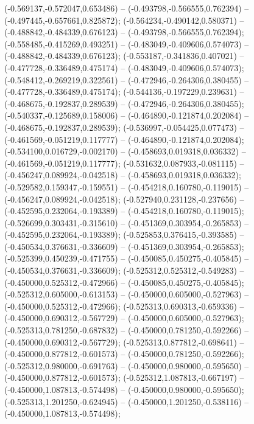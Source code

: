  (-0.569137,-0.572047,0.653486) -- (-0.493798,-0.566555,0.762394) -- (-0.497445,-0.657661,0.825872);
 (-0.564234,-0.490142,0.580371) -- (-0.488842,-0.484339,0.676123) -- (-0.493798,-0.566555,0.762394);
 (-0.558485,-0.415269,0.493251) -- (-0.483049,-0.409606,0.574073) -- (-0.488842,-0.484339,0.676123);
 (-0.553187,-0.341836,0.407021) -- (-0.477728,-0.336489,0.475174) -- (-0.483049,-0.409606,0.574073);
 (-0.548412,-0.269219,0.322561) -- (-0.472946,-0.264306,0.380455) -- (-0.477728,-0.336489,0.475174);
 (-0.544136,-0.197229,0.239631) -- (-0.468675,-0.192837,0.289539) -- (-0.472946,-0.264306,0.380455);
 (-0.540337,-0.125689,0.158006) -- (-0.464890,-0.121874,0.202084) -- (-0.468675,-0.192837,0.289539);
 (-0.536997,-0.054425,0.077473) -- (-0.461569,-0.051219,0.117777) -- (-0.464890,-0.121874,0.202084);
 (-0.534100,0.016729,-0.002170) -- (-0.458693,0.019318,0.036332) -- (-0.461569,-0.051219,0.117777);
 (-0.531632,0.087933,-0.081115) -- (-0.456247,0.089924,-0.042518) -- (-0.458693,0.019318,0.036332);
 (-0.529582,0.159347,-0.159551) -- (-0.454218,0.160780,-0.119015) -- (-0.456247,0.089924,-0.042518);
 (-0.527940,0.231128,-0.237656) -- (-0.452595,0.232064,-0.193389) -- (-0.454218,0.160780,-0.119015);
 (-0.526699,0.303431,-0.315610) -- (-0.451369,0.303954,-0.265853) -- (-0.452595,0.232064,-0.193389);
 (-0.525853,0.376415,-0.393585) -- (-0.450534,0.376631,-0.336609) -- (-0.451369,0.303954,-0.265853);
 (-0.525399,0.450239,-0.471755) -- (-0.450085,0.450275,-0.405845) -- (-0.450534,0.376631,-0.336609);
 (-0.525312,0.525312,-0.549283) -- (-0.450000,0.525312,-0.472966) -- (-0.450085,0.450275,-0.405845);
 (-0.525312,0.605000,-0.613153) -- (-0.450000,0.605000,-0.527963) -- (-0.450000,0.525312,-0.472966);
 (-0.525313,0.690313,-0.659336) -- (-0.450000,0.690312,-0.567729) -- (-0.450000,0.605000,-0.527963);
 (-0.525313,0.781250,-0.687832) -- (-0.450000,0.781250,-0.592266) -- (-0.450000,0.690312,-0.567729);
 (-0.525313,0.877812,-0.698641) -- (-0.450000,0.877812,-0.601573) -- (-0.450000,0.781250,-0.592266);
 (-0.525312,0.980000,-0.691763) -- (-0.450000,0.980000,-0.595650) -- (-0.450000,0.877812,-0.601573);
 (-0.525312,1.087813,-0.667197) -- (-0.450000,1.087813,-0.574498) -- (-0.450000,0.980000,-0.595650);
 (-0.525313,1.201250,-0.624945) -- (-0.450000,1.201250,-0.538116) -- (-0.450000,1.087813,-0.574498);
